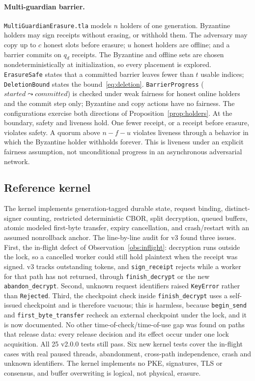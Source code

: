 \documentclass[pdflatex,sn-mathphys-num]{sn-jnl}
\theoremstyle{plain}
\theoremstyle{definition}
\newcommand{\code}[1]{\texttt{#1}}
\begin{document}
\paragraph{Multi-guardian barrier.}
\code{MultiGuardianErasure.tla} models $n$ holders of one generation. Byzantine holders may sign receipts without erasing, or withhold them. The adversary may copy up to $c$ honest slots before erasure; $u$ honest holders are offline; and a barrier commits on $q_d$ receipts. The Byzantine and offline sets are chosen nondeterministically at initialization, so every placement is explored. \code{ErasureSafe} states that a committed barrier leaves fewer than $t$ usable indices; \code{DeletionBound} states the bound~\eqref{eq:deletion}. \code{BarrierProgress} ($\mathit{started}\leadsto\mathit{committed}$) is checked under weak fairness for honest online holders and the commit step only; Byzantine and copy actions have no fairness. The configurations exercise both directions of Proposition~\ref{prop:holders}. At the boundary, safety and liveness hold. One fewer receipt, or a receipt before erasure, violates safety. A quorum above $n-f-u$ violates liveness through a behavior in which the Byzantine holder withholds forever. This is liveness under an explicit fairness assumption, not unconditional progress in an asynchronous adversarial network.

\subsection{Reference kernel}
The kernel implements generation-tagged durable state, request binding, distinct-signer counting, restricted deterministic CBOR, split decryption, queued buffers, atomic modeled first-byte transfer, expiry cancellation, and crash/restart with an assumed nonrollback anchor. The line-by-line audit for v3 found three issues. First, the in-flight defect of Observation~\ref{obs:inflight}: decryption runs outside the lock, so a cancelled worker could still hold plaintext when the receipt was signed. v3 tracks outstanding tokens, and \code{sign\_receipt} rejects while a worker for that path has not returned, through \code{finish\_decrypt} or the new \code{abandon\_decrypt}. Second, unknown request identifiers raised \code{KeyError} rather than \code{Rejected}. Third, the checkpoint check inside \code{finish\_decrypt} uses a self-issued checkpoint and is therefore vacuous; this is harmless, because \code{begin\_send} and \code{first\_byte\_transfer} recheck an external checkpoint under the lock, and it is now documented. No other time-of-check/time-of-use gap was found on paths that release data: every release decision and its effect occur under one lock acquisition. All 25 v2.0.0 tests still pass. Six new kernel tests cover the in-flight cases with real paused threads, abandonment, cross-path independence, crash and unknown identifiers. The kernel implements no PKE, signatures, TLS or consensus, and buffer overwriting is logical, not physical, erasure.
\end{document}
